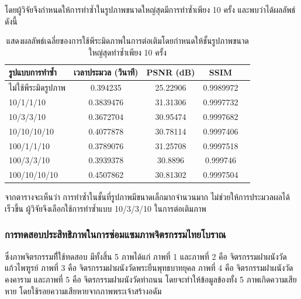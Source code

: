 \documentclass[hidelinks, a4paper,12pt]{article}
\numberwithin{equation}{section}							%
\numberwithin{equation}{section}
\begin{document}
{	 โดยผู้วิจัยจึงกำหนดให้การทำซ้ำในรูปภาพขนาดใหญ่สุดมีการทำซ้ำเพียง 10 ครั้ง และพบว่าได้ผลลัพธ์ดังนี้
	
	\begin{table}[H]
		\centering
		\begin{tabular}[ht]{|l|c|c|c|c|}
			\hline
			รูปแบบการทำซ้ำ  & เวลาประมวล  (วินาที) & PSNR (dB) & SSIM \\
			\hline
			ไม่ใช้พีระมิดรูปภาพ & 0.394235 & 25.22906 & 0.9989972 \\
			10/1/1/10 & 0.3839476 & 31.31306 & 0.9997732 \\
			10/3/3/10 & 0.3672704 & 30.95474 & 0.9997682 \\
			10/10/10/10 & 0.4077878 & 30.78114 & 0.9997406 \\
			100/1/1/10 & 0.3789076 & 31.25708 & 0.9997518 \\
			100/3/3/10 & 0.3939378 & 30.8896 & 0.999746 \\
			100/10/10/10 & 0.4507862 & 30.81302 & 0.9997504 \\
			\hline
		\end{tabular}
		\caption{แสดงผลลัพธ์เฉลี่ยของการใช้พีระมิดภาพในการต่อเติมโดยกำหนดให้ชั้นรูปภาพขนาดใหญ่สุดทำซ้ำเพียง 10 ครั้ง}
	\end{table}	

	จากตารางจะเห็นว่า การทำซ้ำในชั้นที่รูปภาพมีขนาดเล็กมากจำนวนมาก ไม่ช่วยให้การประมวลผลได้เร็วขึ้น ผู้วิจัยจึงเลือกใช้การทำซ้ำแบบ 10/3/3/10 ในการต่อเติมภาพ
	
	\subsubsection{การทดสอบประสิทธิภาพในการซ่อมแซมภาพจิตรกรรมไทยโบราณ}
	\hspace{1cm}ซึ่งภาพจิตรกรรมทีี่ใช้ทดสอบ มีทั้งสิ้น 5  ภาพได้แก่ ภาพที่ 1 และภาพที่ 2 คือ จิตรกรรมฝาผนังวัดแก้วไพฑูรย์ ภาพที่ 3 คือ จิตรกรรมฝาผนังวัดพระยืนพุทธบาทยุคล ภาพที่ 4 คือ จิตรกรรมฝาผนังวัดคงคาราม และภาพที่ 5 คือ จิตรกรรมฝาผนังวัดท่าถนน
	โดยจะทำให้ข้อมูลข้องทั้ง 5 ภาพเกิดความเสียหาย โดยใช้รอยความเสียหายจากภาพพระเจ้าสร้างอดัม
	
}
\end{document}
